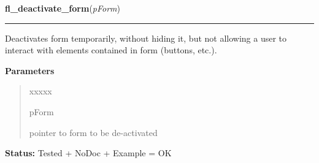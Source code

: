 \hspace{.8\funcindent}\begin{boxedminipage}{\funcwidth}

    \raggedright \textbf{fl\_deactivate\_form}(\textit{pForm})

    \vspace{-1.5ex}

    \rule{\textwidth}{0.5\fboxrule}
\setlength{\parskip}{2ex}
    Deactivates form temporarily, without hiding it, but not allowing a 
    user to interact with elements contained in form (buttons, etc.).

\setlength{\parskip}{1ex}
      \textbf{Parameters}
      \vspace{-1ex}

      \begin{quote}
        \begin{Ventry}{xxxxx}

          \item[pForm]

          pointer to form to be de-activated

        \end{Ventry}

      \end{quote}

\textbf{Status:} Tested + NoDoc + Example = OK



    \end{boxedminipage}

    \label{xformslib:library:fl_activate_form}

    \vspace{0.5ex}


